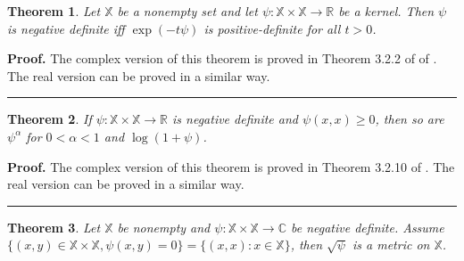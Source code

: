 \documentclass[]{elsarticle}
\def\R{\mathbb{R}}
\newtheorem{theorem}{Theorem}
\newenvironment{proof}[1][Proof]{\noindent\textbf{#1.} }{\ \rule{0.5em}{0.5em}}
\numberwithin{equation}{section}
\numberwithin{theorem}{section}
\newcommand\RR{{\mathbb R}}
\newcommand\CC{{\mathbb C}}
\begin{document}
\begin{theorem}\label{t53}Let $\mathbb{X}$ be a nonempty set and let $\psi: \mathbb{X}\times \mathbb{X}\rightarrow \mathbb{R}$ be a kernel. Then $\psi$ is negative definite iff $\exp(-t\psi)$ is positive-definite for all $t>0$.
\end{theorem}\vspace{-2mm}
\begin{proof}The complex version of this theorem is proved in Theorem 3.2.2 of  of \cite{BCR84}. The real version can be proved in a similar way.
\end{proof}

\begin{theorem}\label{t54}If $\psi:\mathbb{X}\times \mathbb{X}\rightarrow\RR$ is negative definite and $\psi(x,x)\geq 0$, then so are $\psi^{\alpha}$ for $0<\alpha<1$ and $\log(1+\psi)$.
\end{theorem}\vspace{-2mm}
\begin{proof}The complex version of this theorem is proved in Theorem 3.2.10 of \cite{BCR84}. The real version can be proved in a similar way.
\end{proof}

\begin{theorem}\rm{\cite[Proposition 3.3.2]{BCR84} }\label{t55}Let $\mathbb{X}$ be nonempty and $\psi: \mathbb{X}\times \mathbb{X}\rightarrow \CC$ be negative definite. Assume $\{(x,y)\in \mathbb{X}\times \mathbb{X}, \psi(x,y)=0\}=\{(x,x): x\in \mathbb{X}\}$, then $\sqrt{\psi}$ is a metric on $\mathbb{X}$.
\end{theorem}


\end{document}
